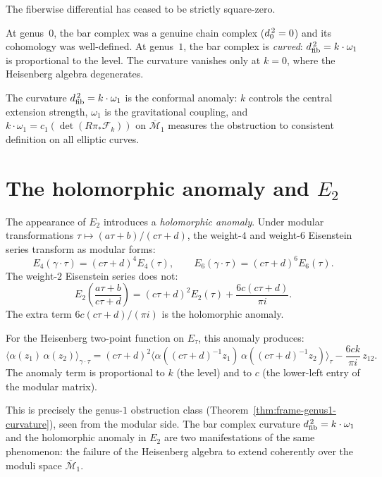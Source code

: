 The fiberwise differential has ceased to be strictly square-zero.

At genus~$0$, the bar complex was a genuine chain complex
($d_0^{\,2} = 0$) and its cohomology was well-defined.  At genus~$1$,
the bar complex is \emph{curved}: $d_{\mathrm{fib}}^{\,2} = k \cdot \omega_1$
is proportional to the level.  The curvature vanishes only at
$k = 0$, where the Heisenberg algebra degenerates.

\begin{remark}
\label{rem:frame-curvature-physics}
The curvature $d_{\mathrm{fib}}^{\,2} = k \cdot \omega_1$ is the conformal anomaly: $k$ controls the central extension strength, $\omega_1$ is the gravitational coupling, and $k \cdot \omega_1 = c_1(\det(R\pi_*\mathcal{F}_k))$ on $\overline{\mathcal{M}}_1$ measures the obstruction to consistent definition on all elliptic curves.
\end{remark}

\section{\texorpdfstring{The holomorphic anomaly and $E_2$}{The holomorphic anomaly and E2}}
\label{sec:frame-holomorphic-anomaly}

The appearance of $E_2$ introduces a \emph{holomorphic anomaly}.
Under modular transformations $\tau \mapsto (a\tau+b)/(c\tau+d)$,
the weight-$4$ and weight-$6$ Eisenstein series transform as
modular forms:
\[
E_4(\gamma \cdot \tau) = (c\tau+d)^4 E_4(\tau), \qquad
E_6(\gamma \cdot \tau) = (c\tau+d)^6 E_6(\tau).
\]
The weight-$2$ Eisenstein series does not:
\begin{equation}\label{eq:frame-E2-anomaly}
E_2\!\left(\frac{a\tau+b}{c\tau+d}\right)
= (c\tau+d)^2 E_2(\tau) + \frac{6c(c\tau+d)}{\pi i}.
\end{equation}
The extra term $6c(c\tau+d)/(\pi i)$ is the holomorphic anomaly.

For the Heisenberg two-point function on $E_\tau$, this anomaly
produces:
\begin{equation}\label{eq:frame-2pt-anomaly}
\langle \alpha(z_1)\, \alpha(z_2) \rangle_{\gamma \cdot \tau}
= (c\tau+d)^2
  \langle \alpha((c\tau+d)^{-1}z_1)\,
  \alpha((c\tau+d)^{-1}z_2) \rangle_\tau
  - \frac{6ck}{\pi i}\, z_{12}.
\end{equation}
The anomaly term is proportional to $k$ (the level) and to $c$
(the lower-left entry of the modular matrix).

This is precisely the genus-$1$ obstruction class
(Theorem~\ref{thm:frame-genus1-curvature}), seen from the modular
side.  The bar complex curvature $d_{\mathrm{fib}}^{\,2} = k \cdot \omega_1$ and the
holomorphic anomaly in $E_2$ are two manifestations of the same
phenomenon: the failure of the Heisenberg algebra to extend
coherently over the moduli space $\overline{\mathcal{M}}_1$.

